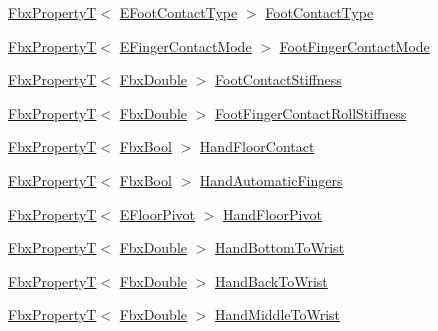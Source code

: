 \begin{DoxyCompactItemize}
\item 
\hyperlink{class_fbx_property_t}{Fbx\+PropertyT}$<$ \hyperlink{class_fbx_character_ac8775e4bfaebf2f84b9968a6b7757d8d}{E\+Foot\+Contact\+Type} $>$ \hyperlink{class_fbx_character_a422e7b0fe0418f16fe99d42ccd407cf3}{Foot\+Contact\+Type}
\item 
\hyperlink{class_fbx_property_t}{Fbx\+PropertyT}$<$ \hyperlink{class_fbx_character_a97bd5ed3c7b4a63bf46ef111e7dc0f0a}{E\+Finger\+Contact\+Mode} $>$ \hyperlink{class_fbx_character_aa5a1aff18a78246caf880e1ea425077b}{Foot\+Finger\+Contact\+Mode}
\item 
\hyperlink{class_fbx_property_t}{Fbx\+PropertyT}$<$ \hyperlink{fbxtypes_8h_a171e72a1c46fc15c1a6c9c31948c1c5b}{Fbx\+Double} $>$ \hyperlink{class_fbx_character_a428481f5695db1219d6674953a933619}{Foot\+Contact\+Stiffness}
\item 
\hyperlink{class_fbx_property_t}{Fbx\+PropertyT}$<$ \hyperlink{fbxtypes_8h_a171e72a1c46fc15c1a6c9c31948c1c5b}{Fbx\+Double} $>$ \hyperlink{class_fbx_character_a477a716a10b48576053524a183841a08}{Foot\+Finger\+Contact\+Roll\+Stiffness}
\item 
\hyperlink{class_fbx_property_t}{Fbx\+PropertyT}$<$ \hyperlink{fbxtypes_8h_a92e0562b2fe33e76a242f498b362262e}{Fbx\+Bool} $>$ \hyperlink{class_fbx_character_ac9bb914a52daa67b3dca1ec311b0dc63}{Hand\+Floor\+Contact}
\item 
\hyperlink{class_fbx_property_t}{Fbx\+PropertyT}$<$ \hyperlink{fbxtypes_8h_a92e0562b2fe33e76a242f498b362262e}{Fbx\+Bool} $>$ \hyperlink{class_fbx_character_a6023f3bc872c3541df2a7b32692742c1}{Hand\+Automatic\+Fingers}
\item 
\hyperlink{class_fbx_property_t}{Fbx\+PropertyT}$<$ \hyperlink{class_fbx_character_a565c1e424493adecfa38e0dcdd17106e}{E\+Floor\+Pivot} $>$ \hyperlink{class_fbx_character_a3386b370bba6a28b9966ae949e2c3f44}{Hand\+Floor\+Pivot}
\item 
\hyperlink{class_fbx_property_t}{Fbx\+PropertyT}$<$ \hyperlink{fbxtypes_8h_a171e72a1c46fc15c1a6c9c31948c1c5b}{Fbx\+Double} $>$ \hyperlink{class_fbx_character_a2145fec76a2cfe6d16172b2fbf9d7a54}{Hand\+Bottom\+To\+Wrist}
\item 
\hyperlink{class_fbx_property_t}{Fbx\+PropertyT}$<$ \hyperlink{fbxtypes_8h_a171e72a1c46fc15c1a6c9c31948c1c5b}{Fbx\+Double} $>$ \hyperlink{class_fbx_character_a953e4bda3fa81d951e4bd8a779bb2b92}{Hand\+Back\+To\+Wrist}
\item 
\hyperlink{class_fbx_property_t}{Fbx\+PropertyT}$<$ \hyperlink{fbxtypes_8h_a171e72a1c46fc15c1a6c9c31948c1c5b}{Fbx\+Double} $>$ \hyperlink{class_fbx_character_a30e904ae4d83a0ee4bdd5ad67085ebb4}{Hand\+Middle\+To\+Wrist}

\end{DoxyCompactItemize}
